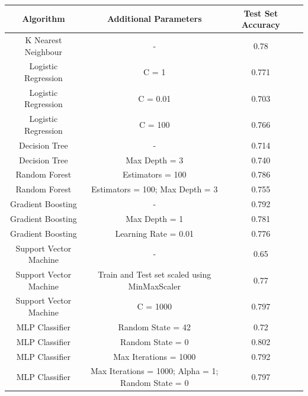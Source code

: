 \documentclass[12pt]{article}
\begin{document}
{
\clearpage
\thispagestyle{empty}
\begin{landscape}
\centering
\begin{table}[]
\centering
\begin{tabular}{|c|c|c|c|}
\hline
Algorithm              & Additional Parameters                               & Test Set Accuracy \\ \hline
K Nearest Neighbour    & -                                                   & 0.78              \\ \hline
Logistic Regression    & C = 1                                               & 0.771             \\ \hline
Logistic Regression    & C = 0.01                                            & 0.703             \\ \hline
Logistic Regression    & C = 100                                             & 0.766             \\ \hline
Decision Tree          & -                                                   & 0.714             \\ \hline
Decision Tree          & Max Depth = 3                                       & 0.740             \\ \hline
Random Forest          & Estimators = 100                                    & 0.786             \\ \hline
Random Forest          & Estimators = 100; Max Depth = 3                     & 0.755             \\ \hline
Gradient Boosting      & -                                                   & 0.792             \\ \hline
Gradient Boosting      & Max Depth = 1                                       & 0.781             \\ \hline
Gradient Boosting      & Learning Rate = 0.01                                & 0.776             \\ \hline
Support Vector Machine & -                                                   & 0.65              \\ \hline
Support Vector Machine & Train and Test set scaled using MinMaxScaler        & 0.77              \\ \hline
Support Vector Machine & C = 1000                                            & 0.797             \\ \hline
MLP Classifier         & Random State = 42                                   & 0.72              \\ \hline
MLP Classifier         & Random State = 0                                    & 0.802             \\ \hline
MLP Classifier         & Max Iterations = 1000                               & 0.792             \\ \hline
MLP Classifier         & Max Iterations = 1000; Alpha = 1; Random State = 0  & 0.797             \\ \hline
\end{tabular}
\end{table}
\label{table:3}
\end{landscape}
\clearpage
}
\end{document}
